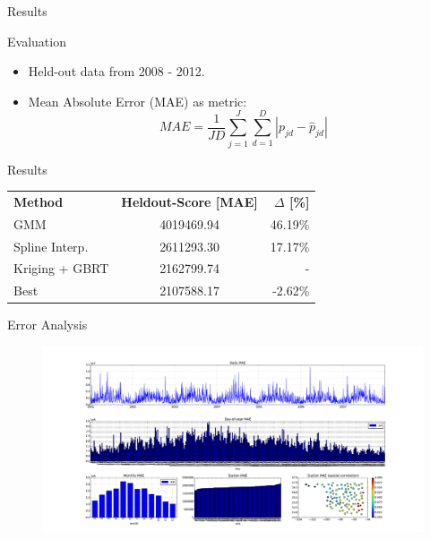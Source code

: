 \documentclass[handout]{beamer}
\begin{document}

\begin{frame}{Results}
  \begin{block}{Evaluation}
      \begin{itemize}
          \item Held-out data from 2008 - 2012.
          \item Mean Absolute Error (MAE) as metric:\\
$${MAE} = \frac{1}{JD} \sum_{j=1}^{J} \sum_{d=1}^{D} | p_{jd} - \hat{p}_{jd} | $$
      \end{itemize}
  \end{block}
  \begin{block}{Results}
        \vspace*{0.4cm}
        \begin{tabular}{ l c r }
          \textbf{Method} & \textbf{Heldout-Score [MAE]} & \textbf{$\Delta$ [\%]} \\
          GMM & 4019469.94 & 46.19\% \\
          Spline Interp. & 2611293.30 & 17.17\% \\
          Kriging + GBRT & 2162799.74 & - \\
          Best & 2107588.17 & -2.62\% \\
        \end{tabular}
  \end{block}
\end{frame}


\begin{frame}{Error Analysis}

\begin{figure}
    \hspace*{-2.2cm}\includegraphics[width=1.4\textwidth]{images/hk_11_err1.pdf}
\end{figure}


\end{frame}
\end{document}
